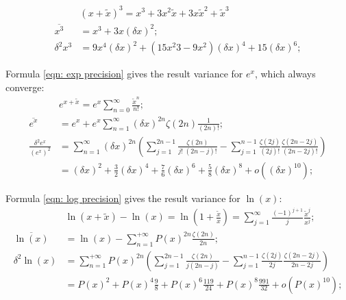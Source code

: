 \documentclass[twoside]{article}
\numberwithin{equation}{section}
\begin{document}
\begin{align*}
& (x + \tilde{x})^3 = x^3 + 3 x^2 \tilde{x} + 3 x \tilde{x}^2 + \tilde{x}^3 \\
\overline{x^3} &= x^3 + 3 x (\delta x)^2; \\
\delta^2 x^3 &= 9 x^4  (\delta x)^2 +  (15 x^2 3 - 9 x^2) (\delta x)^4 + 15 (\delta x)^6;
\end{align*}

\fi


Formula \eqref{eqn: exp precision} gives the result variance for $e^x$, which always converge:
\begin{align}
\label{eqn: exp Taylor}
& e^{x + \tilde{x}} = e^x \sum_{n=0}^{\infty} \frac{\tilde{x}^n}{n!}; \\
\overline{e^x} &= e^x + e^x \sum_{n=1}^{\infty} (\delta x)^{2n} \zeta(2n) \frac{1}{(2n)!}; \\
\label{eqn: exp precision}
\frac{\delta^2 e^x}{(e^x)^2} &= \sum_{n=1}^{\infty} (\delta x)^{2n}  \left( \sum_{j=1}^{2n-1} \frac{\zeta(2n)}{j!\;(2n - j)!} 
 -\sum_{j=1}^{n-1} \frac{\zeta(2j)}{(2j)!} \frac{\zeta(2n - 2j)}{(2n - 2j)!} \right) \\
 &= (\delta x)^2 + \frac{3}{2} (\delta x)^4 + \frac{7}{6} (\delta x)^6 + \frac{5}{8} (\delta x)^8 + o((\delta x)^{10});
\end{align}

Formula \eqref{eqn: log precision} gives the result variance for $\ln(x)$:
\begin{align}
\label{eqn: log Taylor}
& \ln(x + \tilde{x}) - \ln(x) = \ln(1 + \frac{\tilde{x}}{x}) = \sum_{j=1}^{\infty} \frac{(-1)^{j+1}}{j} \frac{\tilde{x}^j}{x^j}; \\
\overline{\ln(x)}  &= \ln(x) -\sum_{n=1}^{+\infty} P(x)^{2n} \frac{\zeta(2n)}{2n}; \\
\label{eqn: log precision}
\delta^2 \ln(x) &= \sum_{n=1}^{+\infty} P(x)^{2n} \left(\sum_{j=1}^{2n-1} \frac{\zeta(2n)}{j (2n-j)}
   - \sum_{j=1}^{n-1} \frac{\zeta(2j)}{2j} \frac{\zeta(2n - 2j)}{2n - 2j} \right) \\
 &= P(x)^2 + P(x)^4 \frac{9}{8}  + P(x)^6 \frac{119}{24} + P(x)^8 \frac{991}{32} + o(P(x)^{10}); 
\end{align}
\end{document}

